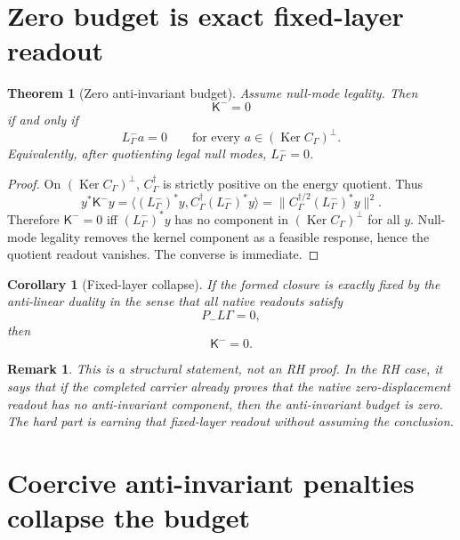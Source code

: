 \documentclass[11pt]{article}
\newtheorem{theorem}{Theorem}
\newtheorem{corollary}{Corollary}
\newtheorem{remark}{Remark}
\newcommand{\K}{\mathsf K}
\newcommand{\Ker}{\operatorname{Ker}}
\begin{document}
\section{Zero budget is exact fixed-layer readout}

\begin{theorem}[Zero anti-invariant budget]
Assume null-mode legality. Then
\begin{equation}
  \K^- =0
\end{equation}
if and only if
\begin{equation}
  L^-_\Gamma a=0 \qquad \text{for every }a\in (\Ker C_\Gamma)^\perp.
\end{equation}
Equivalently, after quotienting legal null modes, \(L^-_\Gamma=0\).
\end{theorem}

\begin{proof}
On \((\Ker C_\Gamma)^\perp\), \(C_\Gamma^\dagger\) is strictly positive on the energy quotient. Thus
\begin{equation}
  y^*\K^- y
  =\langle (L^-_\Gamma)^*y,
  C_\Gamma^\dagger (L^-_\Gamma)^*y\rangle
  =\|C_\Gamma^{\dagger/2}(L^-_\Gamma)^*y\|^2.
\end{equation}
Therefore \(\K^-=0\) iff \((L^-_\Gamma)^*y\) has no component in \((\Ker C_\Gamma)^\perp\) for all \(y\). Null-mode legality removes the kernel component as a feasible response, hence the quotient readout vanishes. The converse is immediate.\end{proof}

\begin{corollary}[Fixed-layer collapse]
If the formed closure is exactly fixed by the anti-linear duality in the sense that all native readouts satisfy
\begin{equation}
P_-L\Gamma=0,
\end{equation}
then
\begin{equation}
\K^-=0.
\end{equation}
\end{corollary}

\begin{remark}
This is a structural statement, not an RH proof. In the RH case, it says that if the completed carrier already proves that the native zero-displacement readout has no anti-invariant component, then the anti-invariant budget is zero. The hard part is earning that fixed-layer readout without assuming the conclusion.
\end{remark}

\section{Coercive anti-invariant penalties collapse the budget}
\end{document}
